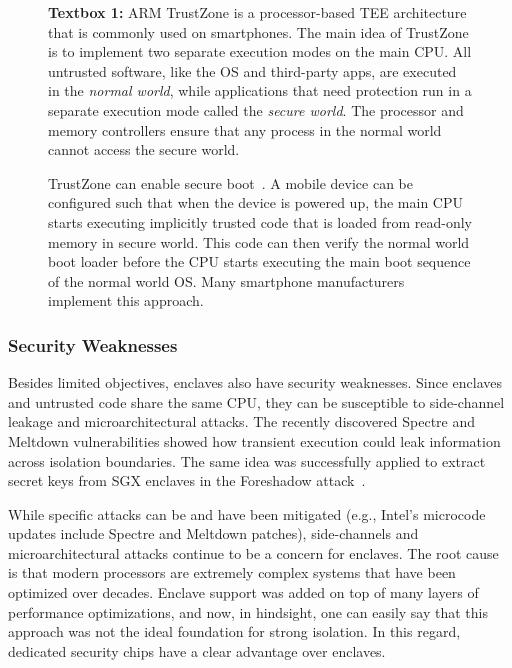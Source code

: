 \begin{figure}
    \begin{tcolorbox}
    \textbf{Textbox 1:} 
    ARM TrustZone is a processor-based TEE architecture that is commonly used on smartphones. The main idea of TrustZone is to implement two separate execution modes on the main CPU. All untrusted software, like the OS and third-party apps, are executed in the \emph{normal world}, while applications that need protection run in a separate execution mode called the \emph{secure world}. The processor and memory controllers ensure that any process in the normal world cannot access the secure world.
    
    \hspace{10pt} TrustZone can enable secure boot~\cite{ekberg2014untapped}. A mobile device can be configured such that when the device is powered up, the main CPU starts executing implicitly trusted code that is loaded from read-only memory in secure world. This code can then verify the normal world boot loader before the CPU starts executing the main boot sequence of the normal world OS. Many smartphone manufacturers implement this approach.
    \end{tcolorbox}
\end{figure}  


\subsubsection*{Security Weaknesses}

Besides limited objectives, enclaves also have security weaknesses. Since enclaves and untrusted code share the same CPU, they can be susceptible to side-channel leakage and microarchitectural attacks. The recently discovered Spectre and Meltdown vulnerabilities showed how transient execution could leak information across isolation boundaries. The same idea was successfully applied to extract secret keys from SGX enclaves in the Foreshadow attack~\cite{van2018foreshadow}. 

While specific attacks can be and have been mitigated (e.g., Intel's microcode updates include Spectre and Meltdown patches), side-channels and microarchitectural attacks continue to be a concern for enclaves. The root cause is that modern processors are extremely complex systems that have been optimized over decades. Enclave support was added on top of many layers of performance optimizations, and now, in hindsight, one can easily say that this approach was not the ideal foundation for strong isolation. In this regard, dedicated security chips have a clear advantage over enclaves.

